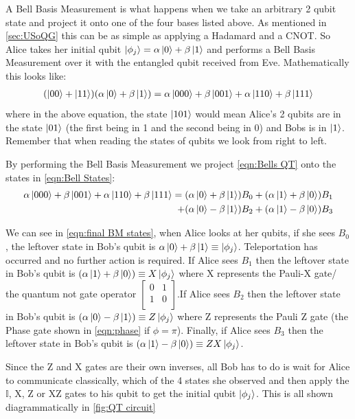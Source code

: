 A Bell Basis Measurement is what happens when we take an arbitrary 2 qubit state and project it onto one of the four bases listed above. As mentioned in \cref{sec:USoQG} this can be as simple as applying a Hadamard and a CNOT. So Alice takes her initial qubit $\ket{\phi_j} = \alpha\ket{0} + \beta\ket{1}$ and performs a Bell Basis Measurement over it with the entangled qubit received from Eve. Mathematically this looks like:
\begin{align} \label{eqn:Bells QT}
    (\ket{00} + \ket{11})(\alpha\ket{0} + \beta\ket{1}) = \alpha\ket{000} + \beta\ket{001} + \alpha\ket{110} + \beta\ket{111}
\end{align}
where in the above equation, the state $\ket{101}$ would mean Alice's 2 qubits are in the state $\ket{01}$ (the first being in 1 and the second being in 0) and Bobs is in $\ket{1}$. Remember that when reading the states of qubits we look from right to left. 

By performing the Bell Basis Measurement we project \cref{eqn:Bells QT} onto the states in \cref{eqn:Bell States}:
\begin{align}\label{eqn:final BM states}
    \alpha\ket{000} + \beta\ket{001} + \alpha\ket{110} + \beta\ket{111} = (\alpha\ket{0} + \beta\ket{1})B_0 + (\alpha\ket{1} + \beta\ket{0})B_1 \\ +(\alpha\ket{0} - \beta\ket{1})B_2 + (\alpha\ket{1} - \beta\ket{0})B_3 
\end{align}

We can see in \cref{eqn:final BM states}, when Alice looks at her qubits, if she sees $B_0$, the leftover state in Bob's qubit is $\alpha\ket{0} + \beta\ket{1} \equiv \ket{\phi_j}$. Teleportation has occurred and no further action is required. If Alice sees $B_1$ then the leftover state in Bob's qubit is $(\alpha\ket{1} + \beta\ket{0}) \equiv X\ket{\phi_j}$ where X represents the Pauli-X gate/ the quantum not gate operator $
\begin{bmatrix}
    0 & 1\\
    1 & 0\\
\end{bmatrix}$.If Alice sees $B_2$ then the leftover state in Bob's qubit is $(\alpha\ket{0} - \beta\ket{1}) \equiv Z\ket{\phi_j}$ where Z represents the Pauli Z gate (the Phase gate shown in \cref{eqn:phase} if $\phi = \pi$). Finally, if Alice sees $B_3$ then the leftover state in Bob's qubit is $(\alpha\ket{1} - \beta\ket{0}) \equiv ZX\ket{\phi_j}$. 

Since the Z and X gates are their own inverses, all Bob has to do is wait for Alice to communicate classically, which of the 4 states she observed and then apply the $\mathbb{I}$, X, Z or XZ gates to his qubit to get the initial qubit $\ket{\phi_j}$. This is all shown diagrammatically in \cref{fig:QT circuit}

